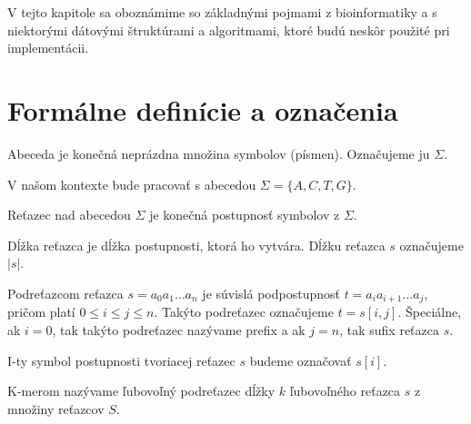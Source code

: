 V tejto kapitole sa oboznámime so základnými pojmami z bioinformatiky a s
niektorými dátovými štruktúrami a algoritmami, ktoré budú neskôr použité pri
implementácii.

\section{Formálne definície a označenia}
\label{sec:formalne_definicie}

\begin{defn}
Abeceda je konečná neprázdna množina symbolov (písmen). Označujeme ju $\Sigma$.
\end{defn}

\begin{pozn}
V našom kontexte bude pracovať s abecedou $\Sigma=\{A, C, T, G\}$.
\end{pozn}

\begin{defn}
Reťazec nad abecedou $\Sigma$ je konečná postupnosť symbolov z $\Sigma$.
\end{defn}

\begin{defn}
Dĺžka reťazca je dĺžka postupnosti, ktorá ho vytvára. Dĺžku reťazca $s$ označujeme $|s|$.
\end{defn}

\begin{defn}
Podreťazcom reťazca $s=a_0 a_1 \ldots a_n$ je súvislá podpostupnosť $t=a_i a_{i+1} \ldots a_j$, pričom platí $0 \leq i \leq j \leq n$. Takýto podreťazec označujeme $t=s[i,j]$. Špeciálne, ak $i=0$, tak takýto podreťazec nazývame prefix a ak $j=n$, tak sufix reťazca $s$.
\end{defn}

\begin{ozn}
I-ty symbol postupnosti tvoriacej reťazec $s$ budeme označovať $s[i]$.
\end{ozn}

\begin{defn}
K-merom nazývame ľubovoľný podreťazec dĺžky $k$ ľubovoľného reťazca $s$ z množiny reťazcov $S$.
\end{defn}

